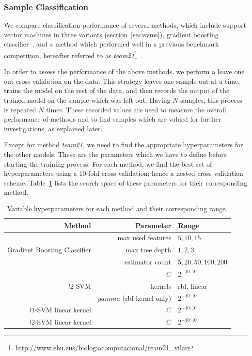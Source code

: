 \subsubsection{Sample Classification}
We compare classification performance of several methods, which include support vector machines in three variants (section~\ref{sec:svms}), gradient boosting classifier~\cite{friedman2002stochastic}, and a method which performed well in a previous benchmark competition, hereafter referred to as \emph{team21}\footnote{\url{http://www.ehu.eus/biologiacomputacional/team21_vilar}}~\cite{Aghaeepour2013Critical}. 

In order to assess the performance of the above methods, we perform a leave one out cross validation on the data. This strategy leaves one sample out at a time, trains the model on the rest of the data, and then records the output of the trained model on the sample which was left out. Having $N$ samples, this process is repeated $N$ times. These recorded values are used to measure the overall performance of methods and to find samples which are valued for further investigations, as explained later.

Except for method \emph{team21}, we need to find the appropriate hyperparameters for the other models. These are the parameters which we have to define before starting the training process. For each method, we find the best set of hyperparameters using a $10$-fold cross validation; hence a nested cross 
validation scheme. Table~\ref{tbl:fcs-qa:hyperparameters} lists the search space of these parameters for their corresponding method.

\begin{table}[!ht]
  \centering
  \begin{tabular}{rrl}
    Method & Parameter & Range \\ \hline \rule{0pt}{2.4ex}
    & max used features & ${5, 10, 15}$  \\
    Gradient Boosting Classifier & max tree depth & ${1, 2, 3}$ \\
    & estimator count & ${5, 20, 50, 100, 200}$ \\ \hline \rule{0pt}{2.4ex}
    & $C$ & $2^{-10:10}$ \\
    $l2$-SVM & kernels & rbf, linear \\
	& $gamma$ (rbf kernel only) & $2^{-10:10}$ \\ \hline \rule{0pt}{2.4ex}
    $l1$-SVM linear kernel & $C$ & $2^{-10:10}$ \\ \hline \rule{0pt}{2.4ex}
    $l2$-SVM linear kernel & $C$ & $2^{-10:10}$ \\
  \end{tabular}
  \caption{Variable hyperparameters for each method and their corresponding range.}
  \label{tbl:fcs-qa:hyperparameters}
\end{table}


